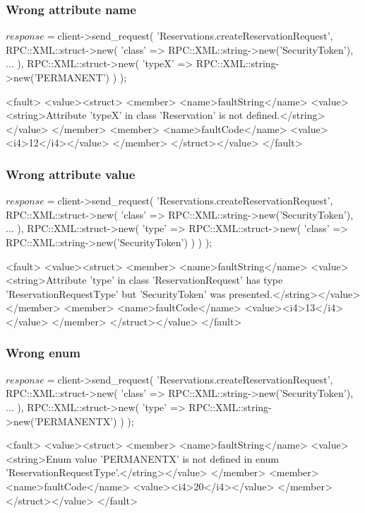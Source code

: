 \subsubsection{Wrong attribute name}
\begin{PerlCmd}
$response = $client->send_request(
    'Reservations.createReservationRequest',
    RPC::XML::struct->new(
        'class' => RPC::XML::string->new('SecurityToken'),
        ...
    ),
    RPC::XML::struct->new(
        'typeX' => RPC::XML::string->new('PERMANENT')
    )
);
\end{PerlCmd}
\begin{PerlResponse}
<fault>
  <value><struct>
    <member>
      <name>faultString</name>
      <value><string>Attribute 'typeX' in class 'Reservation' is not defined.</string></value>
    </member>
    <member>
      <name>faultCode</name>
      <value><i4>12</i4></value>
    </member>
  </struct></value>
</fault>
\end{PerlResponse}

\subsubsection{Wrong attribute value}
\begin{PerlCmd}
$response = $client->send_request(
    'Reservations.createReservationRequest',
    RPC::XML::struct->new(
        'class' => RPC::XML::string->new('SecurityToken'),
        ...
    ),
    RPC::XML::struct->new(
        'type' => RPC::XML::struct->new(
            'class' => RPC::XML::string->new('SecurityToken')
        )
    )
);
\end{PerlCmd}
\begin{PerlResponse}
<fault>
  <value><struct>
    <member>
      <name>faultString</name>
      <value><string>Attribute 'type' in class 'ReservationRequest' has type
          'ReservationRequestType' but 'SecurityToken' was presented.</string></value>
    </member>
    <member>
      <name>faultCode</name>
      <value><i4>13</i4></value>
    </member>
  </struct></value>
</fault>
\end{PerlResponse}

\subsubsection{Wrong enum}
\begin{PerlCmd}
$response = $client->send_request(
    'Reservations.createReservationRequest',
    RPC::XML::struct->new(
        'class' => RPC::XML::string->new('SecurityToken'),
        ...
    ),
    RPC::XML::struct->new(
        'type' => RPC::XML::string->new('PERMANENTX')
    )
);
\end{PerlCmd}
\begin{PerlResponse}
<fault>
  <value><struct>
    <member>
      <name>faultString</name>
      <value><string>Enum value 'PERMANENTX' is not defined in enum
          'ReservationRequestType'.</string></value>
    </member>
    <member>
      <name>faultCode</name>
      <value><i4>20</i4></value>
    </member>
  </struct></value>
</fault>
\end{PerlResponse}

